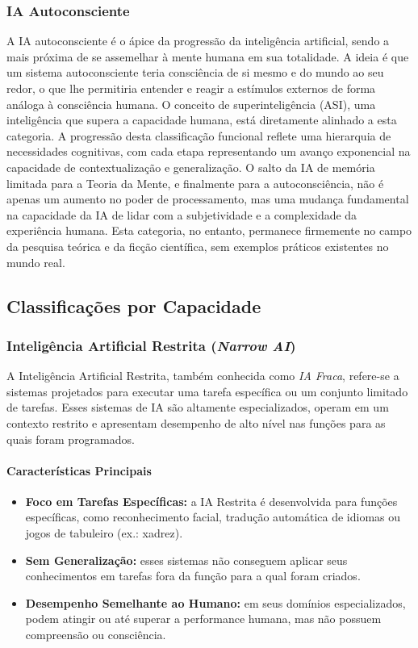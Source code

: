 \subsubsection{IA Autoconsciente}
A IA autoconsciente é o ápice da progressão da inteligência artificial, sendo a mais próxima de se assemelhar à mente humana em sua totalidade. A ideia é que um sistema autoconsciente teria consciência de si mesmo e do mundo ao seu redor, o que lhe permitiria entender e reagir a estímulos externos de forma análoga à consciência humana. O conceito de superinteligência (ASI), uma inteligência que supera a capacidade humana, está diretamente alinhado a esta categoria. A progressão desta classificação funcional reflete uma hierarquia de necessidades cognitivas, com cada etapa representando um avanço exponencial na capacidade de contextualização e generalização. O salto da IA de memória limitada para a Teoria da Mente, e finalmente para a autoconsciência, não é apenas um aumento no poder de processamento, mas uma mudança fundamental na capacidade da IA de lidar com a subjetividade e a complexidade da experiência humana. Esta categoria, no entanto, permanece firmemente no campo da pesquisa teórica e da ficção científica, sem exemplos práticos existentes no mundo real.

\subsection{Classificações por Capacidade}

\subsubsection{Inteligência Artificial Restrita (\emph{Narrow AI})}

A Inteligência Artificial Restrita, também conhecida como \emph{IA Fraca}, refere-se a sistemas projetados para executar uma tarefa específica ou um conjunto limitado de tarefas. Esses sistemas de IA são altamente especializados, operam em um contexto restrito e apresentam desempenho de alto nível nas funções para as quais foram programados.

\paragraph{Características Principais}
\begin{itemize}
    \item \textbf{Foco em Tarefas Específicas:} a IA Restrita é desenvolvida para funções específicas, como reconhecimento facial, tradução automática de idiomas ou jogos de tabuleiro (ex.: xadrez).
    \item \textbf{Sem Generalização:} esses sistemas não conseguem aplicar seus conhecimentos em tarefas fora da função para a qual foram criados.
    \item \textbf{Desempenho Semelhante ao Humano:} em seus domínios especializados, podem atingir ou até superar a performance humana, mas não possuem compreensão ou consciência.
\end{itemize}

